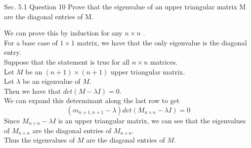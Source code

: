\documentclass[answers,12pt,addpoints]{exam}
\begin{document}
\begin{questions}
    \question[10] Sec. 5.1 Question 10
    Prove that the eigenvalue of an upper triangular matrix M are the diagonal entries of M.
    \begin{solution}
        We can prove this by induction for any $n \times n$ .\\
        For a base case of $1 \times 1$ matrix, we have that the only eigenvalue is the diagonal entry.\\
        Suppose that the statement is true for all $n \times n$ matrices.\\
        Let $M$ be an $(n+1) \times (n+1)$ upper triangular matrix.\\
        Let $\lambda$ be an eigenvalue of $M$.\\
        Then we have that $det(M - \lambda I) = 0$.\\
        We can expand this determinant along the last row to get
        $$(m_{n+1, n+1} - \lambda)det(M_{n \times n} - \lambda I) = 0$$
        Since $M_{n \times n} - \lambda I$ is an upper triangular matrix, we can see that the eigenvalues of $M_{n \times n}$ are the diagonal entries of $M_{n \times n}$.\\
        Thus the eigenvalues of $M$ are the diagonal entries of $M$.
    \end{solution}


\end{questions}
\end{document}
